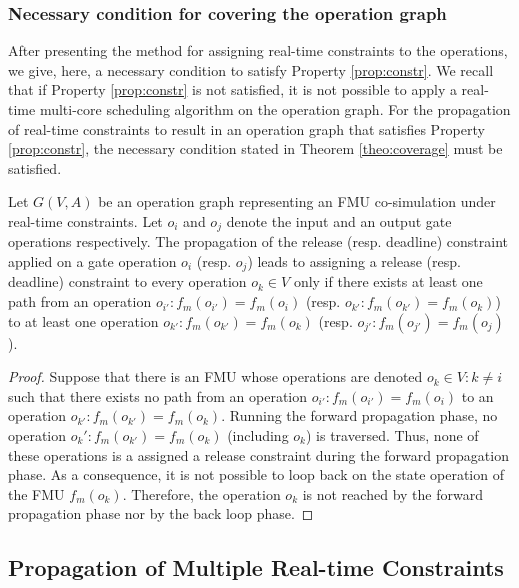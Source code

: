 \subsubsection{Necessary condition for covering the operation graph}

After presenting the method for assigning real-time constraints to the operations, we give, here, a necessary condition to satisfy Property \ref{prop:constr}. We recall that if Property \ref{prop:constr} is not satisfied, it is not possible to apply a real-time multi-core scheduling algorithm on the operation graph. For the propagation of real-time constraints to result in an operation graph that satisfies Property \ref{prop:constr}, the necessary condition stated in Theorem \ref{theo:coverage} must be satisfied.

\begin{theorem}
Let $G(V,A)$ be an operation graph representing an FMU co-simulation under real-time constraints. Let $o_i$ and $o_j$ denote the input and an output gate operations respectively. The propagation of the release (resp. deadline) constraint applied on a gate operation $o_i$ (resp. $o_j$) leads to assigning a release (resp. deadline) constraint to every operation $o_k \in V$ only if there exists at least one path from an operation $o_{i'}: f_m(o_{i'}) = f_m(o_{i})$ (resp. $o_{k'} : f_m(o_{k'}) = f_m(o_k)$) to at least one operation $o_{k'} : f_m(o_{k'}) = f_m(o_k)$ (resp. $o_{j'}: f_m(o_{j'}) = f_m(o_j)$).  
\label{theo:coverage}
\end{theorem}

\begin{proof}
Suppose that there is an FMU whose operations are denoted $o_k \in  V : k \neq i$ such that there exists no path from an operation $o_{i'}: f_m(o_{i'}) = f_m(o_{i})$ to an operation $o_{k'} : f_m(o_{k'}) = f_m(o_k)$. Running the forward propagation phase, no operation $o_k': f_m(o_{k'}) = f_m(o_k)$ (including $o_k$) is traversed. Thus, none of these operations is a assigned a release constraint during the forward propagation phase. As a consequence, it is not possible to loop back on the state operation of the FMU $f_m(o_{k})$. Therefore, the operation $o_k$ is not reached by the forward propagation phase nor by the back loop phase.
\end{proof}

\subsection{Propagation of Multiple Real-time Constraints}

